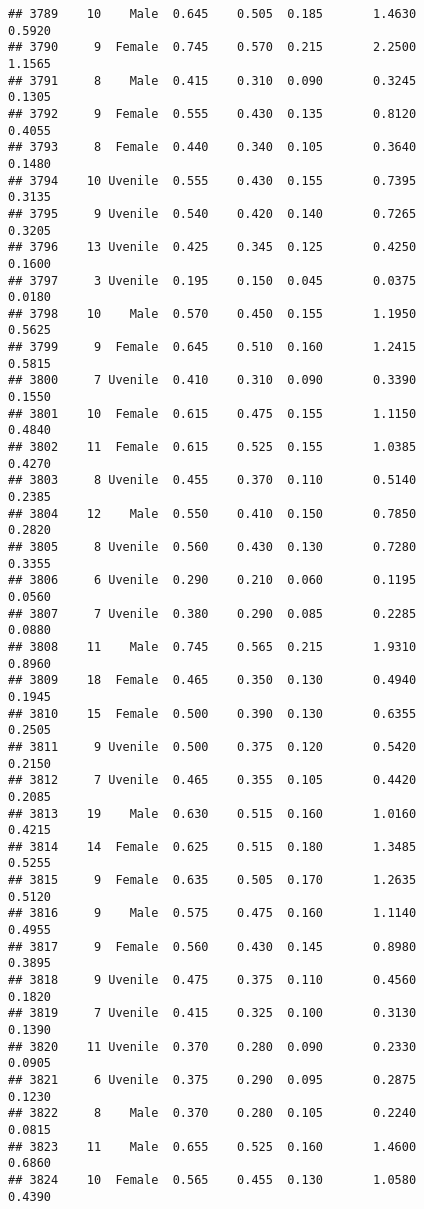 \documentclass[
]{article}
\begin{document}
\begin{verbatim}
## 3789    10    Male  0.645    0.505  0.185       1.4630         0.5920
## 3790     9  Female  0.745    0.570  0.215       2.2500         1.1565
## 3791     8    Male  0.415    0.310  0.090       0.3245         0.1305
## 3792     9  Female  0.555    0.430  0.135       0.8120         0.4055
## 3793     8  Female  0.440    0.340  0.105       0.3640         0.1480
## 3794    10 Uvenile  0.555    0.430  0.155       0.7395         0.3135
## 3795     9 Uvenile  0.540    0.420  0.140       0.7265         0.3205
## 3796    13 Uvenile  0.425    0.345  0.125       0.4250         0.1600
## 3797     3 Uvenile  0.195    0.150  0.045       0.0375         0.0180
## 3798    10    Male  0.570    0.450  0.155       1.1950         0.5625
## 3799     9  Female  0.645    0.510  0.160       1.2415         0.5815
## 3800     7 Uvenile  0.410    0.310  0.090       0.3390         0.1550
## 3801    10  Female  0.615    0.475  0.155       1.1150         0.4840
## 3802    11  Female  0.615    0.525  0.155       1.0385         0.4270
## 3803     8 Uvenile  0.455    0.370  0.110       0.5140         0.2385
## 3804    12    Male  0.550    0.410  0.150       0.7850         0.2820
## 3805     8 Uvenile  0.560    0.430  0.130       0.7280         0.3355
## 3806     6 Uvenile  0.290    0.210  0.060       0.1195         0.0560
## 3807     7 Uvenile  0.380    0.290  0.085       0.2285         0.0880
## 3808    11    Male  0.745    0.565  0.215       1.9310         0.8960
## 3809    18  Female  0.465    0.350  0.130       0.4940         0.1945
## 3810    15  Female  0.500    0.390  0.130       0.6355         0.2505
## 3811     9 Uvenile  0.500    0.375  0.120       0.5420         0.2150
## 3812     7 Uvenile  0.465    0.355  0.105       0.4420         0.2085
## 3813    19    Male  0.630    0.515  0.160       1.0160         0.4215
## 3814    14  Female  0.625    0.515  0.180       1.3485         0.5255
## 3815     9  Female  0.635    0.505  0.170       1.2635         0.5120
## 3816     9    Male  0.575    0.475  0.160       1.1140         0.4955
## 3817     9  Female  0.560    0.430  0.145       0.8980         0.3895
## 3818     9 Uvenile  0.475    0.375  0.110       0.4560         0.1820
## 3819     7 Uvenile  0.415    0.325  0.100       0.3130         0.1390
## 3820    11 Uvenile  0.370    0.280  0.090       0.2330         0.0905
## 3821     6 Uvenile  0.375    0.290  0.095       0.2875         0.1230
## 3822     8    Male  0.370    0.280  0.105       0.2240         0.0815
## 3823    11    Male  0.655    0.525  0.160       1.4600         0.6860
## 3824    10  Female  0.565    0.455  0.130       1.0580         0.4390

\end{verbatim}
\end{document}
